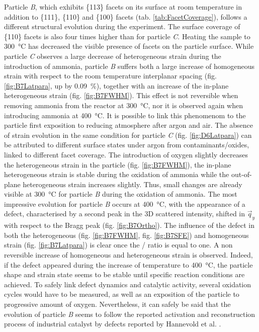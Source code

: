 Particle \textit{B}, which exhibits \{113\} facets on its surface at room temperature in addition to \{111\}, \{110\} and \{100\} facets (tab. \ref{tab:FacetCoverage}), follows a different structural evolution during the experiment.
The surface coverage of \{110\} facets is also four times higher than for particle \textit{C}.
Heating the sample to \qty{300}{\degreeCelsius} has decreased the visible presence of facets on the particle surface.
While particle \textit{C} observes a large decrease of heterogeneous strain during the introduction of ammonia, particle \textit{B} suffers both a large increase of homogeneous strain with respect to the room temperature interplanar spacing (fig. \ref{fig:B7Latpara}, up by \qty{0.09}{\percent}), together with an increase of the in-plane heterogeneous strain (fig. \ref{fig:B7FWHM}).
This effect is not reversible when removing ammonia from the reactor at \qty{300}{\degreeCelsius}, nor it is observed again when introducing ammonia at \qty{400}{\degreeCelsius}.
It is possible to link this phenomenom to the particle first exposition to reducing atmosphere after argon and air.
The absence of strain evolution in the same condition for particle \textit{C} (fig. \ref{fig:D6Latpara}) can be attributed to different surface states under argon from contaminants/oxides, linked to different facet coverage.
The introduction of oxygen slightly decreases the heterogeneous strain in the particle (fig. \ref{fig:B7FWHM}), the in-plane heterogeneous strain is stable during the oxidation of ammonia while the out-of-plane heterogeneous strain increases slightly.
Thus, small changes are already visible at \qty{300}{\degreeCelsius} for particle \textit{B} during the oxidation of ammonia.
The most impressive evolution for particle \textit{B} occurs at \qty{400}{\degreeCelsius}, with the appearance of a defect, characterised by a second peak in the 3D scattered intensity, shifted in $\vec{q}_y$ with respect to the Bragg peak (fig. \ref{fig:B7Ortho}).
The influence of the defect in both the heterogeneous (fig. \ref{fig:B7FWHM}, fig. \ref{fig:B7SFE}) and homogeneous strain (fig. \ref{fig:B7Latpara}) is clear once the / ratio is equal to one.
A non reversible increase of homogeneous and heterogeneous strain is observed.
Indeed, if the defect appeared during the increase of temperature to \qty{400}{\degreeCelsius}, the particle shape and strain state seems to be stable until specific reaction conditions are achieved.
To safely link defect dynamics and catalytic activity, several oxidation cycles would have to be measured, as well as an exposition of the particle to progressive amount of oxygen.
Nevertheless, it can safely be said that the evolution of particle \textit{B} seems to follow the reported activation and reconstruction process of industrial catalyst by defects reported by Hannevold et al. \parencite*{Hannevold2005}.

